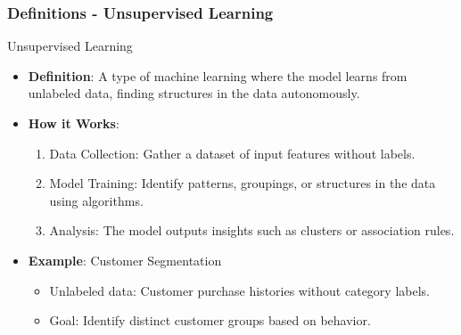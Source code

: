 \documentclass[aspectratio=169]{beamer}
\begin{document}
\begin{frame}[fragile]
    \frametitle{Definitions - Unsupervised Learning}
    \begin{block}{Unsupervised Learning}
        \begin{itemize}
            \item \textbf{Definition}: A type of machine learning where the model learns from unlabeled data, finding structures in the data autonomously.
            \item \textbf{How it Works}:
                \begin{enumerate}
                    \item Data Collection: Gather a dataset of input features without labels.
                    \item Model Training: Identify patterns, groupings, or structures in the data using algorithms.
                    \item Analysis: The model outputs insights such as clusters or association rules.
                \end{enumerate}
            \item \textbf{Example}: Customer Segmentation
                \begin{itemize}
                    \item Unlabeled data: Customer purchase histories without category labels.
                    \item Goal: Identify distinct customer groups based on behavior.
                \end{itemize}
        \end{itemize}
    \end{block}
\end{frame}
\end{document}
